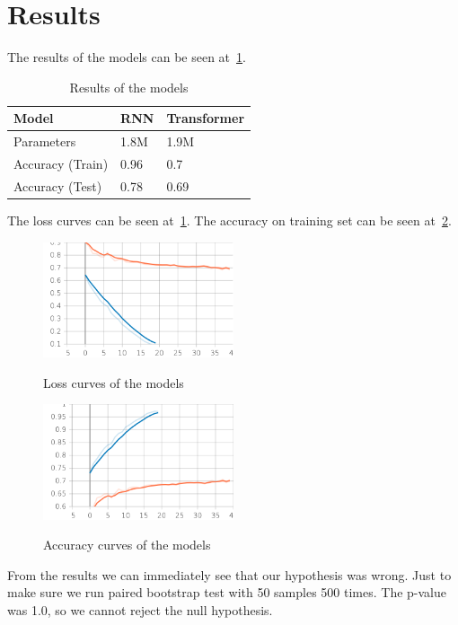 \documentclass{article}
\begin{document}
    \section{Results}
    The results of the models can be seen at~\ref{tab:results}.
    \begin{table}[h!]
        \centering
        \begin{tabular}{ | m{5em} | m{2cm}| m{3cm} | } 
            \hline
            Model & RNN & Transformer \\
            \hline
            Parameters & 1.8M & 1.9M \\
            \hline
            Accuracy (Train) & 0.96 & 0.7 \\
            \hline
            Accuracy (Test) & 0.78 & 0.69 \\
            \hline
        \end{tabular}
        \caption{Results of the models}\label{tab:results}
    \end{table}
    The loss curves can be seen at~\ref{fig:loss_curves}.
    The accuracy on training set can be seen at~\ref{fig:acc_curves}.
    \begin{figure}[h!]
        \centering
        \includegraphics[width=0.5\textwidth]{Loss.png}\label{fig:loss_curves}
        \caption{Loss curves of the models}
    \end{figure}
    \begin{figure}[h!]
        \centering
        \includegraphics[width=0.5\textwidth]{Accuracy.png}\label{fig:acc_curves}
        \caption{Accuracy curves of the models}
    \end{figure}
    From the results we can immediately see that our hypothesis was wrong.
    Just to make sure we run paired bootstrap test with 50 samples 500 times.
    The p-value was 1.0, so we cannot reject the null hypothesis.
\end{document}
